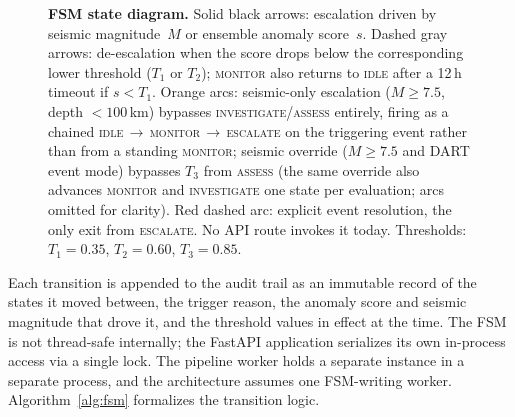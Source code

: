 \documentclass{article}
\begin{document}
\begin{figure}[t]
\caption{\textbf{FSM state diagram.}
  Solid black arrows: escalation driven by seismic magnitude~$M$ or
  ensemble anomaly score~$s$.
  Dashed gray arrows: de-escalation when the score drops below the
  corresponding lower threshold ($T_1$ or $T_2$); \textsc{monitor}
  also returns to \textsc{idle} after a 12\,h timeout if $s < T_1$.
  Orange arcs: seismic-only escalation ($M \geq 7.5$, depth $< 100$\,km)
  bypasses \textsc{investigate}/\textsc{assess} entirely, firing as a
  chained \textsc{idle}\,$\to$\,\textsc{monitor}\,$\to$\,\textsc{escalate}
  on the triggering event rather than from a standing \textsc{monitor};
  seismic override ($M \geq 7.5$ and DART event mode)
  bypasses $T_3$ from \textsc{assess} (the same override also advances
  \textsc{monitor} and \textsc{investigate} one state per evaluation;
  arcs omitted for clarity).
  Red dashed arc: explicit event resolution, the only exit from
  \textsc{escalate}. No API route invokes it today.
  Thresholds: $T_1{=}0.35$, $T_2{=}0.60$, $T_3{=}0.85$.}
\label{fig:fsm}
\end{figure}

Each transition is appended to the audit trail as an immutable record
of the states it moved between, the trigger reason, the anomaly score
and seismic magnitude that drove it, and the threshold values in
effect at the time. The FSM is not thread-safe internally; the FastAPI application
serializes its own in-process access via a single lock.  The pipeline
worker holds a separate instance in a separate process, and the
architecture assumes one FSM-writing worker.
Algorithm~\ref{alg:fsm} formalizes the transition logic.
\end{document}
